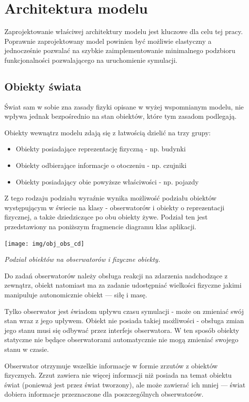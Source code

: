 {{\section[Architektura modelu][Architektura modelu]{Architektura modelu}
\par{
Zaprojektowanie właściwej architektury modelu jest kluczowe dla celu tej pracy. Poprawnie zaprojektowany model powinien być możliwie elastyczny a jednocześnie pozwalać na szybkie zaimplementowanie minimalnego podzbioru funkcjonalności pozwalającego na uruchomienie symulacji.
}
\subsection{Obiekty świata}
\par{
Świat sam w sobie zna zasady fizyki opisane w wyżej wspomnianym modelu, nie wpływa jednak bezpośrednio na stan obiektów, które tym zasadom podlegają.
}
\par{
Obiekty wewnątrz modelu zdają się z łatwością dzielić na trzy grupy:
\begin{itemize}
\item Obiekty posiadające reprezentację fizyczną - np. budynki
\item Obiekty odbierające informacje o otoczeniu - np. czujniki
\item Obiekty posiadający obie powyższe właściwości - np. pojazdy
\end{itemize}
Z tego rodzaju podziału wyraźnie wynika możliwość podziału obiektów występującym w świecie na klasy - obserwatorów i obiekty o reprezentacji fizycznej, a także dziedziczące po obu obiekty żywe. Podział ten jest przedstawiony na poniższym fragmencie diagramu klas aplikacji.
}

\par{
\begin{center}
\texttt{[image: img/obj\_obs\_cd]}
\end{center}
}
\par{
\begin{center}
\textit{Podział obiektów na obserwatorów i fizyczne obiekty.}
\end{center}
}
\par{
Do zadań obserwatorów należy obsługa reakcji na zdarzenia nadchodzące z zewnątrz, obiekt natomiast ma za zadanie udostępniać wielkości fizyczne jakimi manipuluje autonomicznie obiekt --- siłę i masę.
}
\par{
Tylko obserwator jest świadom upływu czasu symulacji - może on zmieniać swój stan wraz z jego upływem. Obiekt nie posiada takiej możliwości - obsługa zmian jego stanu musi się odbywać przez interfejs obserwatora. W ten sposób obiekty statyczne nie będące obserwatorami automatycznie nie mogą zmieniać swojego stanu w czasie.
}
\par{
Obserwator otrzymuje wszelkie informacje w formie zrzutów z obiektów fizycznych. Zrzut zawiera nie więcej informacji niż posiada na temat obiektu świat (ponieważ jest przez świat tworzony), ale może zawierać ich mniej --- świat dobiera informacje przeznaczone dla poszczególnych obserwatorów.
}

}}
